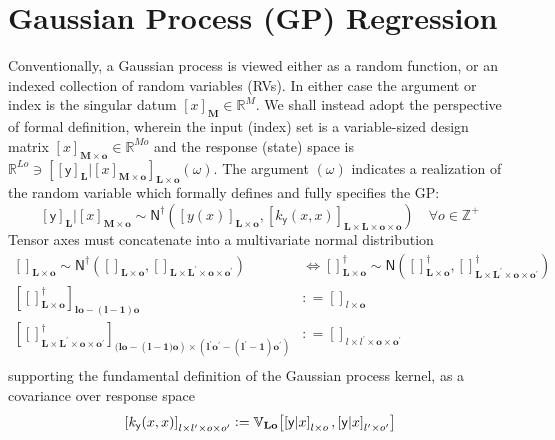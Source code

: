 \documentclass[preprint,12pt]{elsarticle}
\newcommand*{\M}[1]{\ensuremath{#1}\xspace}
\newcommand*{\x}{\times}
\newcommand*{\mi}[1]{\mathbf{#1}}
\newcommand*{\st}[1]{\mathbb{#1}}
\newcommand*{\rv}[1]{\mathsf{#1}}
\newcommand*{\te}[2][]{\left\lbrack{#2}\right\rbrack_{#1}}
\newcommand*{\deq}{\M{\mathrel{\mathop:}=}}
\newcommand*{\cov}[3][]{\ifthenelse{\equal{#1}{}}{\mathbb{V}_{#3}\!\left\lbrack{#2}\right\rbrack}{\mathbb{V}_{#3}\!\left\lbrack{#2,#1}\right\rbrack}}
\newcommand*{\gauss}[2]{\mathsf{N}\!\left({#1,#2}\right)}
\newcommand*{\gaussd}[2]{\mathsf{N}^{\dagger}\!\left({#1,#2}\right)}
\begin{document}
    \section{Gaussian Process (GP) Regression} \label{sec:GP}
        Conventionally, a Gaussian process is viewed either as a random function, or an indexed collection of random variables (RVs). In either case the argument or index is the singular datum $\te[\mi{M}]{x}\in\st{R}^M$.
        We shall instead adopt the perspective of formal definition, wherein the input (index) set is a variable-sized design matrix $\te[\mi{M}\x\mi{o}]{x}\in\st{R}^{Mo}$ and the response (state) space is $\st{R}^{Lo}\ni\te[\mi{L}\x\mi{o}]{\te[\mi{L}]{\rv{y}} \vert \te[\mi{M}\x\mi{o}]{x}}(\omega)$. The argument $(\omega)$ indicates a realization of the random variable which formally defines and fully specifies the GP:
        \begin{equation*}
            \te[\mi{L}]{\rv{y}} \big\vert \te[\mi{M}\x\mi{o}]{x} \sim 
            \gaussd{\te[\mi{L}\x\mi{o}]{y(x)}}{\te[\mi{L}\x\mi{L}\x\mi{o}\x\mi{o}]
            {k_{\rv{y}}(x,x)}} \quad \forall o \in \st{Z^{+}}
        \end{equation*}
        Tensor axes must concatenate into a multivariate normal distribution
        \begin{equation*}
            \begin{aligned}
                \te[\mi{L}\x\mi{o}]{} \sim \gaussd{\te[\mi{L}\x\mi{o}]{}}{\te[\mi{L}\x\mi{L^{\prime}}\x\mi{o}\x\mi{o^{\prime}}]{}}
                & \Longleftrightarrow
                \te[\mi{L}\x\mi{o}]{}^{\dagger} \sim \gauss{\te[\mi{L}\x\mi{o}]{}^{\dagger}}{\te[\mi{L}\x\mi{L^{\prime}}\x\mi{o}\x\mi{o^{\prime}}]{}^{\dagger}} \\
                \te[\mi{lo}-\mi{(l-1)o}]{\te[\mi{L}\x\mi{o}]{}^{\dagger}} 
                &\deq \te[l\x\mi{o}]{} \\
                \te[(\mi{lo}-(\mi{l-1)o}) \x (\mi{l^{\prime}o^{\prime}}-\mi{(l^{\prime}-1)o^{\prime}})]
                {\te[\mi{L}\x\mi{L^{\prime}}\x\mi{o}\x\mi{o^{\prime}}]{}^{\dagger}} 
                &\deq \te[l \x l^{\prime}\x\mi{o}\x\mi{o^{\prime}}]{} \\
            \end{aligned}
        \end{equation*}
        supporting the fundamental definition of the Gaussian process kernel, as a covariance over response space
        \begin{equation*}
            \te[l\x l^{\prime}\x o\x o^{\prime}]{k_{\rv{y}}(x,x)} 
            \deq \cov[{\te[l^{\prime}\x o^{\prime}]{\rv{y}\vert x}}]{\te[l\x o]{\rv{y}\vert x}}{\mi{Lo}}
        \end{equation*}
\end{document}
